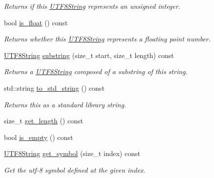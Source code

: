 \begin{DoxyCompactItemize}
\begin{DoxyCompactList}\small\item\em Returns if this \hyperlink{classchaos_1_1str_1_1_u_t_f8_string}{U\+T\+F8\+String} represents an unsigned integer. \end{DoxyCompactList}\item 
\hypertarget{classchaos_1_1str_1_1_u_t_f8_string_a2fbd69fb90a390df37c119577d4d3c6a}{}bool \hyperlink{classchaos_1_1str_1_1_u_t_f8_string_a2fbd69fb90a390df37c119577d4d3c6a}{is\+\_\+float} () const \label{classchaos_1_1str_1_1_u_t_f8_string_a2fbd69fb90a390df37c119577d4d3c6a}

\begin{DoxyCompactList}\small\item\em Returns whether this \hyperlink{classchaos_1_1str_1_1_u_t_f8_string}{U\+T\+F8\+String} represents a floating point number. \end{DoxyCompactList}\item 
\hyperlink{classchaos_1_1str_1_1_u_t_f8_string}{U\+T\+F8\+String} \hyperlink{classchaos_1_1str_1_1_u_t_f8_string_a2d50ab58715264ae175f521816bf670c}{substring} (size\+\_\+t start, size\+\_\+t length) const 
\begin{DoxyCompactList}\small\item\em Returns a \hyperlink{classchaos_1_1str_1_1_u_t_f8_string}{U\+T\+F8\+String} composed of a substring of this string. \end{DoxyCompactList}\item 
std\+::string \hyperlink{classchaos_1_1str_1_1_u_t_f8_string_a8901fbbe5e72d7bf8f0d160b55475244}{to\+\_\+std\+\_\+string} () const 
\begin{DoxyCompactList}\small\item\em Returns this as a standard library string. \end{DoxyCompactList}\item 
size\+\_\+t \hyperlink{classchaos_1_1str_1_1_u_t_f8_string_ac0c724e649182e02462b48b94d1f5bf7}{get\+\_\+length} () const 
\item 
bool \hyperlink{classchaos_1_1str_1_1_u_t_f8_string_a4fc296e90fbbc45a1e3f142dcd1e9853}{is\+\_\+empty} () const 
\item 
\hyperlink{classchaos_1_1str_1_1_u_t_f8_string}{U\+T\+F8\+String} \hyperlink{classchaos_1_1str_1_1_u_t_f8_string_a04dbe9f15dc1b09c858e2450de26d40a}{get\+\_\+symbol} (size\+\_\+t index) const 
\begin{DoxyCompactList}\small\item\em Get the utf-\/8 symbol defined at the given index. \end{DoxyCompactList}\item 

\end{DoxyCompactItemize}
